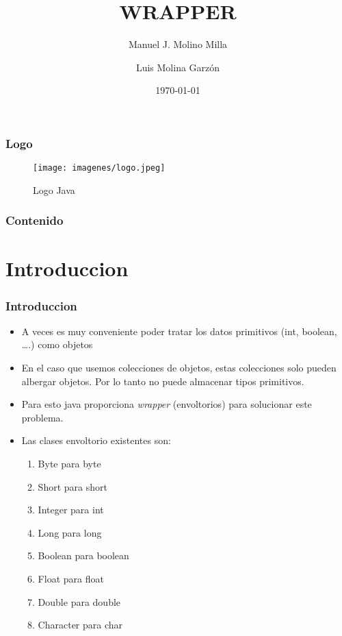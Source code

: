 \documentclass{beamer}
\title{WRAPPER}
\author{Manuel J. Molino Milla \and Luis Molina Garzón}
\date{\today} %
\institute{IES Virgen del Carmen \and Departamento de Informática}
\begin{document}
\begin{frame}
  \titlepage
\end{frame}

\begin{frame}
    \frametitle{Logo}
\begin{figure}
\texttt{[image: imagenes/logo.jpeg]} 
\caption{Logo Java}
\end{figure}
\end{frame}

\begin{frame}
  \frametitle{Contenido}
  \tableofcontents[pausesections]
\end{frame}



\section{Introduccion}

\begin{frame}
    \frametitle{Introduccion}

\begin{itemize}[<+->]
      \item A veces es muy conveniente poder tratar los datos primitivos (int, boolean, \dots.) como objetos
      \item En el caso que usemos colecciones de objetos, estas colecciones solo pueden albergar objetos. Por lo tanto no puede almacenar tipos primitivos.
	   \item Para esto java proporciona \emph{wrapper} (envoltorios) para solucionar este problema.      
      \item Las clases envoltorio existentes son:
      \begin{enumerate}
\item \alert{Byte} para \alert{byte}
\item \alert{Short} para \alert{short}
\item \alert{Integer} para \alert{int}
\item \alert{Long} para \alert{long}
\item \alert{Boolean} para \alert{boolean}
\item \alert{Float} para \alert{float}
\item \alert{Double} para \alert{double}
\item \alert{Character} para \alert{char}
\end{enumerate}
      \end{itemize}
\end{frame}
\end{document}
